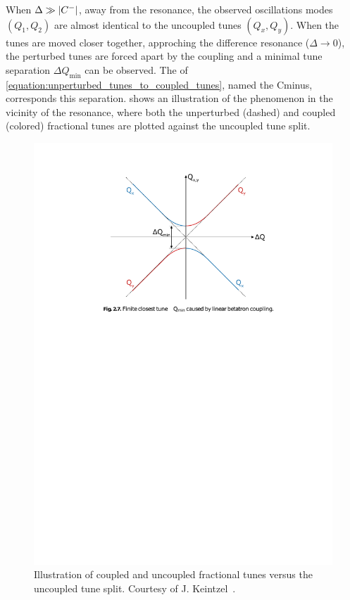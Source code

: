 When \(\Delta \gg \left\lvert C^{-} \right\rvert\), away from the resonance, the observed oscillations modes \((Q_1, Q_2)\) are almost identical to the uncoupled tunes \((Q_x, Q_y)\).
When the tunes are moved closer together, approching the difference resonance (\(\Delta \rightarrow 0\)), the perturbed tunes are forced apart by the coupling and a minimal tune separation \(\Delta Q_{\mathrm{min}}\) can be observed.
The  of \cref{equation:unperturbed_tunes_to_coupled_tunes}, named the \gls{Cminus}, corresponds this separation.
 shows an illustration of the phenomenon in the vicinity of the resonance, where both the unperturbed (dashed) and coupled (colored) fractional tunes are plotted against the uncoupled tune split.

\begin{figure}[!htb]
    \centering
    \includegraphics[width=0.9\linewidth]{Figures/Beam_Dynamics_Theory/closest_tune_approach_schematic.pdf}
    \caption{Illustration of coupled and uncoupled fractional tunes versus the uncoupled tune split. Courtesy of J. Keintzel~\cite{PHD:Keintzel}.}
    \label{figure:closest_tune_approach}
\end{figure}

